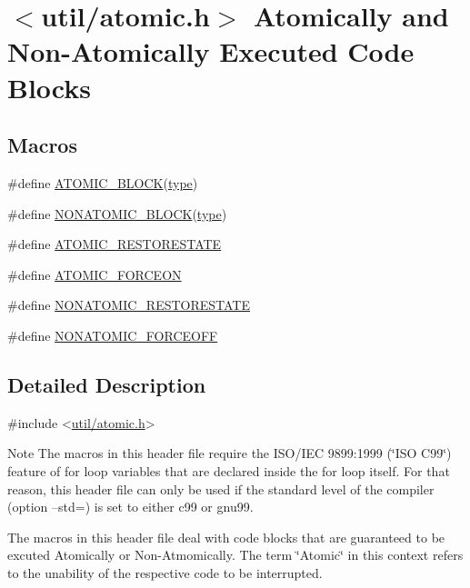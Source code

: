 \hypertarget{group__util__atomic}{}\section{$<$util/atomic.h$>$ Atomically and Non-\/\+Atomically Executed Code Blocks}
\label{group__util__atomic}
\subsection*{Macros}
\begin{DoxyCompactItemize}
\item 
\#define \hyperlink{group__util__atomic_gaaaea265b31dabcfb3098bec7685c39e4}{A\+T\+O\+M\+I\+C\+\_\+\+B\+L\+O\+CK}(\hyperlink{_sd_fat_structs_8h_a1d127017fb298b889f4ba24752d08b8e}{type})
\item 
\#define \hyperlink{group__util__atomic_ga6e195ee2117559a25f77fbba9054674a}{N\+O\+N\+A\+T\+O\+M\+I\+C\+\_\+\+B\+L\+O\+CK}(\hyperlink{_sd_fat_structs_8h_a1d127017fb298b889f4ba24752d08b8e}{type})
\item 
\#define \hyperlink{group__util__atomic_ga362c18b15a09703e42e1c246c47420ef}{A\+T\+O\+M\+I\+C\+\_\+\+R\+E\+S\+T\+O\+R\+E\+S\+T\+A\+TE}
\item 
\#define \hyperlink{group__util__atomic_ga92b11103b4b3b000a3190f0d26ba7062}{A\+T\+O\+M\+I\+C\+\_\+\+F\+O\+R\+C\+E\+ON}
\item 
\#define \hyperlink{group__util__atomic_gab075653bf638fae9db049575741d3152}{N\+O\+N\+A\+T\+O\+M\+I\+C\+\_\+\+R\+E\+S\+T\+O\+R\+E\+S\+T\+A\+TE}
\item 
\#define \hyperlink{group__util__atomic_gafb959d7d00d2d790b58d0e9880ea255a}{N\+O\+N\+A\+T\+O\+M\+I\+C\+\_\+\+F\+O\+R\+C\+E\+O\+FF}
\end{DoxyCompactItemize}


\subsection{Detailed Description}

\begin{DoxyCode}
\textcolor{preprocessor}{#include <\hyperlink{atomic_8h}{util/atomic.h}>}
\end{DoxyCode}


\begin{DoxyNote}{Note}
The macros in this header file require the I\+S\+O/\+I\+EC 9899\+:1999 (\char`\"{}\+I\+S\+O C99\char`\"{}) feature of for loop variables that are declared inside the for loop itself. For that reason, this header file can only be used if the standard level of the compiler (option --std=) is set to either {\ttfamily c99} or {\ttfamily gnu99}.
\end{DoxyNote}
The macros in this header file deal with code blocks that are guaranteed to be excuted Atomically or Non-\/\+Atmomically. The term \char`\"{}\+Atomic\char`\"{} in this context refers to the unability of the respective code to be interrupted.

